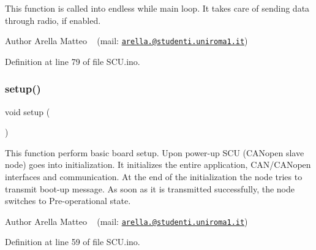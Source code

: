 This function is called into endless while main loop. It takes care of sending data through radio, if enabled. 

\begin{DoxyAuthor}{Author}
Arella Matteo ~\newline
 (mail\+: \href{mailto:arella.1646983@studenti.uniroma1.it}{\tt arella.@studenti.\+uniroma1.\+it}) 
\end{DoxyAuthor}


Definition at line 79 of file S\+C\+U.\+ino.

\mbox{\label{group___main__group__module_ga4fc01d736fe50cf5b977f755b675f11d}} 
\subsubsection{\texorpdfstring{setup()}{setup()}}
{\footnotesize\ttfamily void setup (\begin{DoxyParamCaption}{ }\end{DoxyParamCaption})}



This function perform basic board setup. Upon power-\/up S\+CU (C\+A\+Nopen slave node) goes into initialization. It initializes the entire application, C\+A\+N/\+C\+A\+Nopen interfaces and communication. At the end of the initialization the node tries to transmit boot-\/up message. As soon as it is transmitted successfully, the node switches to Pre-\/operational state. 

\begin{DoxyAuthor}{Author}
Arella Matteo ~\newline
 (mail\+: \href{mailto:arella.1646983@studenti.uniroma1.it}{\tt arella.@studenti.\+uniroma1.\+it}) 
\end{DoxyAuthor}


Definition at line 59 of file S\+C\+U.\+ino.

